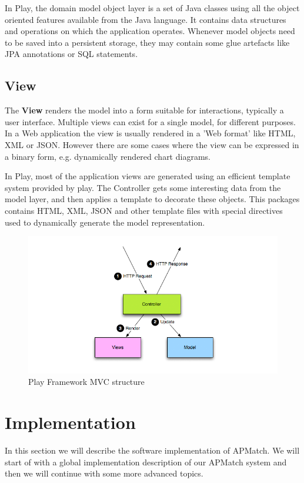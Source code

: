 In Play, the domain model object layer is a set of Java classes using all the object oriented features available from the Java language. 
It contains data structures and operations on which the application operates. 
Whenever model objects need to be saved into a persistent storage, they may contain some glue artefacts like JPA annotations or SQL statements.

\subsection{View}
The \textbf{View} renders the model into a form suitable for interactions, typically a user interface.
Multiple views can exist for a single model, for different purposes.
In a Web application the view is usually rendered in a 'Web format' like HTML, XML or JSON.
However there are some cases where the view can be expressed in a binary form, e.g. dynamically rendered chart diagrams.

In Play, most of the application views are generated using an efficient template system provided by play. 
The Controller gets some interesting data from the model layer, and then applies a template to decorate these objects. 
This packages contains HTML, XML, JSON and other template files with special directives used to dynamically generate the model representation.
\\
\begin{figure}[h]
  \centering
    \captionsetup{justification=centering}
    \includegraphics[width=\textwidth]{play_mvc}
    \caption{Play Framework MVC structure}
  \label{play_mvc_image}
\end{figure}


\section{Implementation}
In this section we will describe the software implementation of APMatch.
We will start of with a global implementation description of our APMatch system and then we will continue with some more advanced topics.

